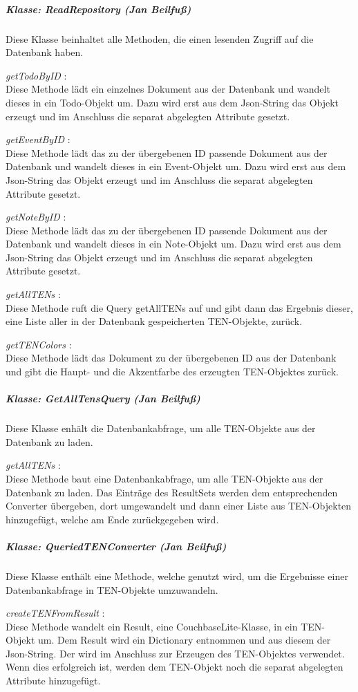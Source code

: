 \subparagraph{Klasse: ReadRepository (Jan Beilfuß)}
Diese Klasse beinhaltet alle Methoden, die einen lesenden Zugriff auf die Datenbank haben.

\textit{ getTodoByID }:\\
Diese Methode lädt ein einzelnes Dokument aus der Datenbank und wandelt dieses in ein Todo-Objekt um. Dazu wird erst aus dem Json-String das Objekt erzeugt und im Anschluss die separat abgelegten Attribute gesetzt.

\textit{ getEventByID }:\\
Diese Methode lädt das zu der übergebenen ID passende Dokument aus der Datenbank und wandelt dieses in ein Event-Objekt um. Dazu wird erst aus dem Json-String das Objekt erzeugt und im Anschluss die separat abgelegten Attribute gesetzt.

\textit{ getNoteByID }:\\
Diese Methode lädt das zu der übergebenen ID passende Dokument aus der Datenbank und wandelt dieses in ein Note-Objekt um. Dazu wird erst aus dem Json-String das Objekt erzeugt und im Anschluss die separat abgelegten Attribute gesetzt.

\textit{ getAllTENs }:\\
Diese Methode ruft die Query getAllTENs auf und gibt dann das Ergebnis dieser, eine Liste aller in der Datenbank gespeicherten TEN-Objekte, zurück.

\textit{ getTENColors }:\\
Diese Methode lädt das Dokument zu der übergebenen ID aus der Datenbank und gibt die Haupt- und die Akzentfarbe des erzeugten TEN-Objektes zurück.
\subparagraph{Klasse: GetAllTensQuery (Jan Beilfuß)}
Diese Klasse enhält die Datenbankabfrage, um alle TEN-Objekte aus der Datenbank zu laden.

\textit{ getAllTENs }:\\
Diese Methode baut eine Datenbankabfrage, um alle TEN-Objekte aus der Datenbank zu laden. Das Einträge des ResultSets werden dem entsprechenden Converter übergeben, dort umgewandelt und dann einer Liste aus TEN-Objekten hinzugefügt, welche am Ende zurückgegeben wird.

\subparagraph{Klasse: QueriedTENConverter (Jan Beilfuß)}
Diese Klasse enthält eine Methode, welche genutzt wird, um die Ergebnisse einer Datenbankabfrage in TEN-Objekte umzuwandeln.

\textit{ createTENFromResult }:\\
Diese Methode wandelt ein Result, eine CouchbaseLite-Klasse, in ein TEN-Objekt um. Dem Result wird ein Dictionary entnommen und aus diesem der Json-String. Der wird im Anschluss zur Erzeugen des TEN-Objektes verwendet. Wenn dies erfolgreich ist, werden dem TEN-Objekt noch die separat abgelegten Attribute hinzugefügt.


